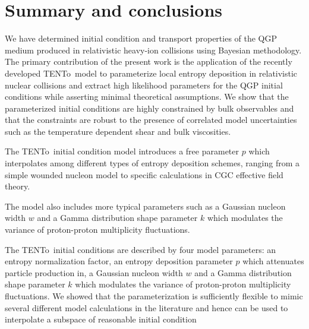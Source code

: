 \documentclass[aps,prc,reprint,amsmath,nofootinbib,superscriptaddress]{revtex4-1}
\newcommand{\trento}{T\raisebox{-0.5ex}{R}ENTo}
\begin{document}



\section{Summary and conclusions}

We have determined initial condition and transport properties of the QGP medium produced in relativistic heavy-ion collisions using Bayesian methodology. The primary contribution of the present work is the application of the recently developed \trento\ model to parameterize local entropy deposition in relativistic nuclear collisions and extract high likelihood parameters for the QGP initial conditions while asserting minimal theoretical assumptions. We show that the parameterized initial conditions are highly constrained by bulk observables and that the constraints are robust to the presence of correlated model uncertainties such as the temperature dependent shear and bulk viscosities.

The \trento\ initial condition model introduces a free parameter $p$ which interpolates among different types of entropy deposition schemes, ranging from a simple wounded nucleon model to specific calculations in CGC effective field theory. 


The model also includes more typical parameters such as a Gaussian nucleon width $w$ and a Gamma distribution shape parameter $k$ which modulates the variance of proton-proton multiplicity fluctuations. 

The \trento\ initial conditions are described by four model parameters: an entropy normalization factor, an entropy deposition parameter $p$ which attenuates particle production in, a Gaussian nucleon width $w$ and a Gamma distribution shape parameter $k$ which modulates the variance of proton-proton multiplicity fluctuations. We showed that the parameterization is sufficiently flexible to mimic several different model calculations in the literature and hence can be used to interpolate a subspace of reasonable initial condition 
\end{document}

